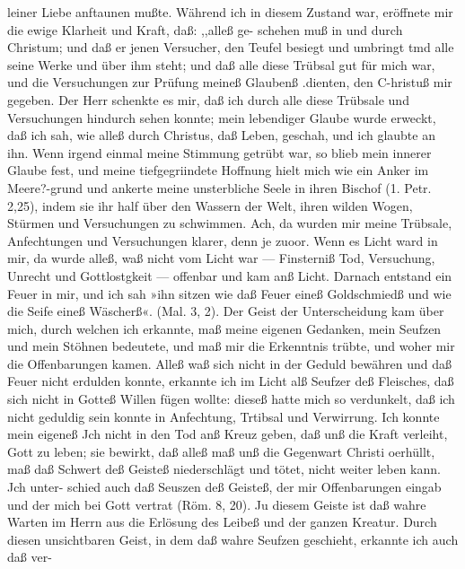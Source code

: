 leiner Liebe anftaunen mußte. Während ich in diesem Zustand
war, eröffnete mir die ewige Klarheit und Kraft, daß: ,,alleß ge-
schehen muß in und durch Christum; und daß er jenen Versucher,
den Teufel besiegt und umbringt tmd alle seine Werke und über
ihm steht; und daß alle diese Trübsal gut für mich war, und
die Versuchungen zur Prüfung meineß Glaubenß .dienten, den
C-hristuß mir gegeben. Der Herr schenkte es mir, daß ich durch
alle diese Trübsale und Versuchungen hindurch sehen konnte;
mein lebendiger Glaube wurde erweckt, daß ich sah, wie alleß
durch Christus, daß Leben, geschah, und ich glaubte an ihn. Wenn
irgend einmal meine Stimmung getrübt war, so blieb mein innerer
Glaube fest, und meine tiefgegriindete Hoffnung hielt mich wie
ein Anker im Meere?-grund und ankerte meine unsterbliche Seele
in ihren Bischof (1. Petr. 2,25), indem sie ihr half über den Wassern
der Welt, ihren wilden Wogen, Stürmen und Versuchungen zu
schwimmen. Ach, da wurden mir meine Trübsale, Anfechtungen
und Versuchungen klarer, denn je zuoor. Wenn es Licht ward
in mir, da wurde alleß, waß nicht vom Licht war — Finsterniß
Tod, Versuchung, Unrecht und Gottlostgkeit — offenbar und kam
anß Licht. Darnach entstand ein Feuer in mir, und ich sah »ihn
sitzen wie daß Feuer eineß Goldschmiedß und wie die Seife eineß
Wäscherß«. (Mal. 3, 2). Der Geist der Unterscheidung kam über
mich, durch welchen ich erkannte, maß meine eigenen Gedanken,
mein Seufzen und mein Stöhnen bedeutete, und maß mir die
Erkenntnis trübte, und woher mir die Offenbarungen kamen.
Alleß waß sich nicht in der Geduld bewähren und daß Feuer
nicht erdulden konnte, erkannte ich im Licht alß Seufzer deß
Fleisches, daß sich nicht in Gotteß Willen fügen wollte: dieseß
hatte mich so verdunkelt, daß ich nicht geduldig sein konnte in
Anfechtung, Trtibsal und Verwirrung. Ich konnte mein eigeneß
Jch nicht in den Tod anß Kreuz geben, daß unß die Kraft
verleiht, Gott zu leben; sie bewirkt, daß alleß maß unß
die Gegenwart Christi oerhüllt, maß daß Schwert deß Geisteß
niederschlägt und tötet, nicht weiter leben kann. Jch unter-
schied auch daß Seuszen deß Geisteß, der mir Offenbarungen
eingab und der mich bei Gott vertrat (Röm. 8, 20). Ju diesem
Geiste ist daß wahre Warten im Herrn aus die Erlösung des
Leibeß und der ganzen Kreatur. Durch diesen unsichtbaren Geist,
in dem daß wahre Seufzen geschieht, erkannte ich auch daß ver-





